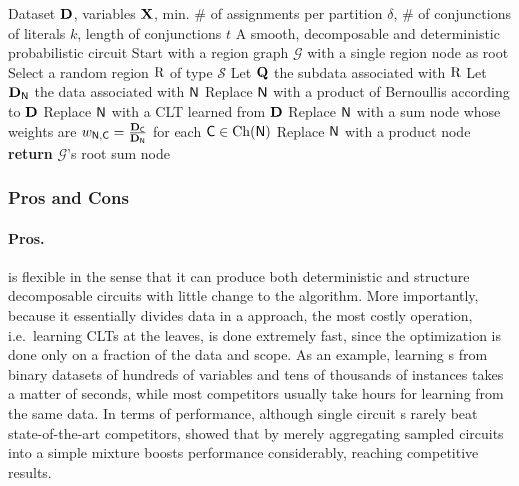 \begin{algorithm}[t]
  \caption{}\label{alg:xpcs}
  \begin{algorithmic}[1]
    \Require Dataset $\mathbf{D}$, variables $\mathbf{X}$, min. \# of assignments per partition $\delta$,
    \# of conjunctions of literals $k$, length of conjunctions $t$
    \Ensure A smooth, decomposable and deterministic probabilistic circuit
    \State Start with a region graph $\mathcal{G}$ with a single region node as root
      \State Select a random region $\operatorname{\textrm{R}}$ of type $\mathcal{S}$
      \State Let $\mathbf{Q}$ the subdata associated with $\operatorname{\textrm{R}}$
      \State {}
    \EndWhile
      \State Let $\mathbf{D}_{\operatorname{\textsf{N}}}$ the data associated with $\operatorname{\textsf{N}}$
        \State Replace $\operatorname{\textsf{N}}$ with a product of Bernoullis according to $\mathbf{D}$
        \State Replace $\operatorname{\textsf{N}}$ with a CLT learned from $\mathbf{D}$
        \State Replace $\operatorname{\textsf{N}}$ with a sum node whose weights are
          $w_{\operatorname{\textsf{N}},\operatorname{\textsf{C}}}=\frac{\mathbf{D}_{\operatorname{\textsf{C}}}}{\mathbf{D}_{\operatorname{\textsf{N}}}}$ for each $\operatorname{\textsf{C}}\in\operatorname*{\normalfont{Ch}}(\operatorname{\textsf{N}})$
      \Else
        \State Replace $\operatorname{\textsf{N}}$ with a product node
      \EndIf
    \EndFor
    \State \textbf{return} $\mathcal{G}$'s root sum node
  \end{algorithmic}
\end{algorithm}

\subsubsection{Pros and Cons}

\paragraph{Pros.}  is flexible in the sense that it can produce both deterministic
and structure decomposable circuits with little change to the algorithm. More importantly, because
it essentially divides data in a \divclass{} approach, the most costly operation, i.e.\ learning
CLTs at the leaves, is done extremely fast, since the optimization is done only on a fraction of
the data and scope. As an example, learning s from binary datasets of hundreds of
variables and tens of thousands of instances takes a matter of seconds, while most competitors
usually take hours for learning from the same data. In terms of performance, although single
circuit s rarely beat state-of-the-art competitors, \citet{dimauro21} showed that by
merely aggregating sampled circuits into a simple mixture boosts performance considerably, reaching
competitive results.

